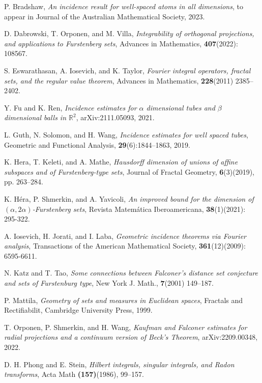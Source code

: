 \documentclass[11pt]{article}
\newcommand{\1}{\mathbf{1}}
\begin{document}
\begin{thebibliography}{}
P. Bradshaw,\textit{ An incidence result for well-spaced atoms in all dimensions}, to appear in 
Journal of the Australian Mathematical Society, 2023. 

D. Dabrowski, T. Orponen, and M. Villa, \textit{Integrability of orthogonal projections, and applications to Furstenberg sets}, Advances in Mathematics, \textbf{407}(2022): 108567.


 S. Eswarathasan, A. Iosevich, and K. Taylor, \textit{Fourier integral operators, fractal sets,
and the regular value theorem}, Advances in Mathematics, \textbf{228}(2011) 2385–2402.


 Y. Fu and K. Ren,  \textit{Incidence estimates for $\alpha $ dimensional tubes and $\beta$ dimensional balls in $\mathbb R^2$}, arXiv:2111.05093, 2021.



L. Guth, N. Solomon, and H. Wang, \textit{Incidence estimates for well spaced
tubes}, Geometric and Functional Analysis, \textbf{29}(6):1844–1863, 2019.

K. Hera, T. Keleti, and A. Mathe, \textit{Hausdorff dimension of unions of affine subspaces and of Furstenberg-type sets}, Journal of Fractal Geometry, \textbf{6}(3)(2019), pp. 263--284.




K. H\'{e}ra, P. Shmerkin, and A. Yavicoli, \textit{An improved bound for the dimension of $(\alpha, 2\alpha) $-Furstenberg sets}, Revista Matemática Iberoamericana, \textbf{38}(1)(2021): 295-322.


A. Iosevich, H. Jorati, and I. Laba, \textit{Geometric incidence theorems via Fourier analysis}, Transactions of the American Mathematical Society, \textbf{361}(12)(2009): 6595-6611.


 N. Katz and T. Tao, \textit{Some connections between Falconer's distance set conjecture and sets of Furstenburg type}, New York J. Math., \textbf{7}(2001) 149--187.





P. Mattila, \textit{Geometry of sets and measures in Euclidean spaces}, Fractals and Rectifiabilit, Cambridge University Press, 1999.


T. Orponen, P. Shmerkin, and H. Wang, \textit{Kaufman and Falconer estimates for radial projections and a continuum version of Beck's Theorem}, arXiv:2209.00348, 2022.



 D. H. Phong and E. Stein, \textit{Hilbert integrals, singular integrals, and Radon transforms}, Acta Math \textbf{(157)}(1986), 99--157.









\end{thebibliography}
\end{document}

